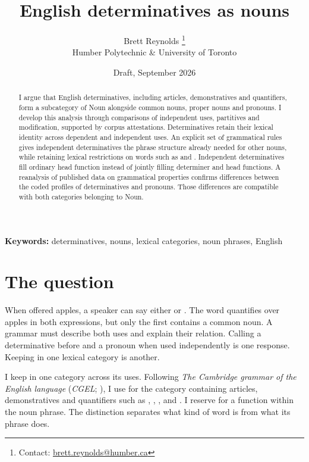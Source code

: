 \documentclass[12pt]{article}
\title{English determinatives as nouns}
\author{Brett Reynolds \orcidlink{0000-0003-0073-7195}%
\thanks{Contact: \href{mailto:brett.reynolds@humber.ca}{brett.reynolds@humber.ca}}\\
Humber Polytechnic \& University of Toronto}
\date{Draft, September 2026}
\begin{document}
\maketitle

\begin{abstract}
I argue that English determinatives, including articles, demonstratives and quantifiers, form a subcategory of Noun alongside common nouns, proper nouns and pronouns. I develop this analysis through comparisons of independent uses, partitives and modification, supported by corpus attestations. Determinatives retain their lexical identity across dependent and independent uses. An explicit set of grammatical rules gives independent determinatives the phrase structure already needed for other nouns, while retaining lexical restrictions on words such as  and . Independent determinatives fill ordinary head function instead of jointly filling determiner and head functions. A reanalysis of published data on grammatical properties confirms differences between the coded profiles of determinatives and pronouns. Those differences are compatible with both categories belonging to Noun.
\end{abstract}

\noindent\textbf{Keywords:} determinatives, nouns, lexical categories, noun phrases, English

\section{The question}\label{sec:intro}

When offered apples, a speaker can say either  or . The word  quantifies over apples in both expressions, but only the first contains a common noun. A grammar must describe both uses and explain their relation. Calling  a determinative before  and a pronoun when used independently is one response. Keeping  in one lexical category is another.

I keep  in one category across its uses. Following \textit{The Cambridge grammar of the English language} (\textit{CGEL}; \citealt{huddleston2002}), I use  for the category containing articles, demonstratives and quantifiers such as , , ,  and . I reserve  for a function within the noun phrase. The distinction separates what kind of word  is from what its phrase does.
\end{document}

